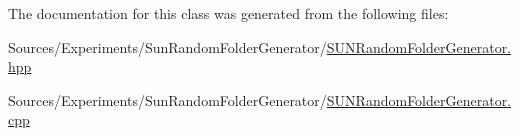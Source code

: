 The documentation for this class was generated from the following files\+:\begin{DoxyCompactItemize}
\item 
Sources/\+Experiments/\+Sun\+Random\+Folder\+Generator/\hyperlink{_s_u_n_random_folder_generator_8hpp}{S\+U\+N\+Random\+Folder\+Generator.\+hpp}\item 
Sources/\+Experiments/\+Sun\+Random\+Folder\+Generator/\hyperlink{_s_u_n_random_folder_generator_8cpp}{S\+U\+N\+Random\+Folder\+Generator.\+cpp}\end{DoxyCompactItemize}

